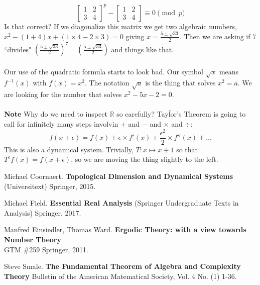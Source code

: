 \documentclass[12pt]{article}
\begin{document}
$$ 
\left[ \begin{array}{cc} 1 & 2 \\ 3 & 4 \end{array} \right]^p - 
\left[ \begin{array}{cc} 1 & 2 \\ 3 & 4 \end{array} \right] \equiv 0 \pmod p $$
Is that correct?  If we diagonalize this matrix we get two algebraic numbers, $x^2 - (1+4)x + (1 \times 4 - 2 \times 3) = 0 $ giving $x = \frac{5 \pm \sqrt{33}}{2}$.  Then we are asking if $7$ ``divides"  $(\frac{5 \pm \sqrt{33}}{2})^7 - (\frac{5 \pm \sqrt{33}}{2})$ and things like that.\\ \\
Our use of the quadratic formula starts to look bad.  Our symbol $\sqrt{x}$ means $f^{-1}(x)$ with $f(x) = x^2$.  The notation $\sqrt{a}$ is the thing that solves $x^2 = a$.  We are looking for the number that solves $x^2 - 5x - 2 = 0$.  
  \\ \\
\textbf{Note} Why do we need to inspect $\mathbb{R}$ so carefully?  Tayĺor's Theorem is going to call for infinitely many steps involvin $+$ and $-$ and $\times$ and $\div$:
$$ f(x + \epsilon) = f(x) + \epsilon \times f'(x) + \frac{\epsilon^2}{2} \times f''(x) + \dots  $$
This is also a dynamical system.  Trivially, $T : x \mapsto x + 1$ so that $T^\epsilon f(x) = f(x+\epsilon)$, so we are moving the thing slightly to the left.
\vfill 

\begin{thebibliography}{}

\item Michael Coornaert. \textbf{Topological Dimension and Dynamical Systems} (Universitext) Springer, 2015.

\item Michael Field. \textbf{Essential Real Analysis} (Springer Undergraduate Texts in Analysis) Springer, 2017.


\item Manfred Einsiedler, Thomas Ward. \textbf{Ergodic Theory: with a view towards Number Theory} \\GTM \#259 Springer, 2011.

\item Steve Smale. \textbf{The Fundamental Theorem of Algebra and Complexity Theory} Bulletin of the American Matematical Society, Vol. 4 No. (1) 1-36.


\end{thebibliography}
\end{document}
